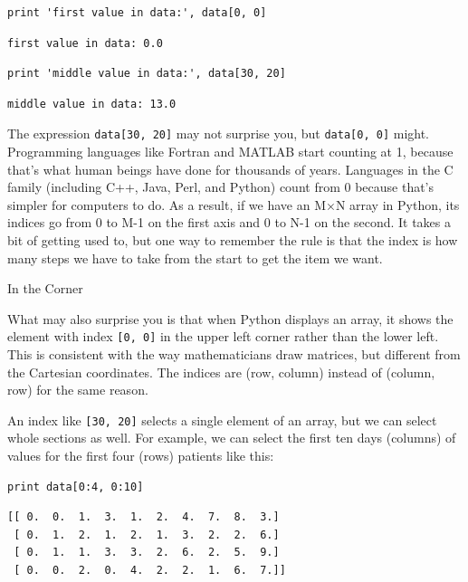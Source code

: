 \documentclass{book}
\begin{document}
\begin{verbatim}
print 'first value in data:', data[0, 0]
\end{verbatim}

\begin{verbatim}
first value in data: 0.0
\end{verbatim}

\begin{verbatim}
print 'middle value in data:', data[30, 20]
\end{verbatim}

\begin{verbatim}
middle value in data: 13.0
\end{verbatim}

The expression \texttt{data{[}30, 20{]}} may not surprise you, but
\texttt{data{[}0, 0{]}} might. Programming languages like Fortran and
MATLAB start counting at 1, because that's what human beings have done
for thousands of years. Languages in the C family (including C++, Java,
Perl, and Python) count from 0 because that's simpler for computers to
do. As a result, if we have an M×N array in Python, its indices go from
0 to M-1 on the first axis and 0 to N-1 on the second. It takes a bit of
getting used to, but one way to remember the rule is that the index is
how many steps we have to take from the start to get the item we want.

\begin{swcbox}{In the Corner}

What may also surprise you is that when Python displays an array, it
shows the element with index \texttt{{[}0, 0{]}} in the upper left
corner rather than the lower left. This is consistent with the way
mathematicians draw matrices, but different from the Cartesian
coordinates. The indices are (row, column) instead of (column, row) for
the same reason.

\end{swcbox}

An index like \texttt{{[}30, 20{]}} selects a single element of an
array, but we can select whole sections as well. For example, we can
select the first ten days (columns) of values for the first four (rows)
patients like this:

\begin{verbatim}
print data[0:4, 0:10]
\end{verbatim}

\begin{verbatim}
[[ 0.  0.  1.  3.  1.  2.  4.  7.  8.  3.]
 [ 0.  1.  2.  1.  2.  1.  3.  2.  2.  6.]
 [ 0.  1.  1.  3.  3.  2.  6.  2.  5.  9.]
 [ 0.  0.  2.  0.  4.  2.  2.  1.  6.  7.]]
\end{verbatim}
\end{document}
